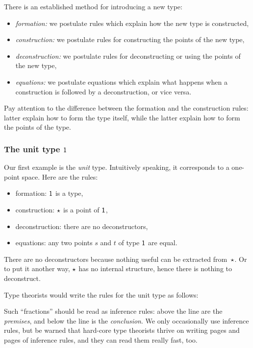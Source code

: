 \documentclass{amsart}
\begin{document}
There is an established method for introducing a new type:
%
\begin{itemize}
\item \emph{formation:} we postulate rules which explain how the new type is constructed,
\item \emph{construction:} we postulate rules for constructing the points of the new type,
\item \emph{deconstruction:} we postulate rules for deconstructing or using the points of the new type,
\item \emph{equations:} we postulate equations which explain what happens when a
  construction is followed by a deconstruction, or vice versa.
\end{itemize}
%
Pay attention to the difference between the formation and the construction
rules: latter explain how to form the type itself, while the latter explain how to
form the points of the type.


\subsubsection{The unit type $\mathsf{1}$}

Our first example is the \emph{unit} type. Intuitively speaking, it corresponds to a one-point space. Here are the rules:
%
\begin{itemize}
\item formation: $\mathsf{1}$ is a type,
\item construction: $\star$ is a point of $\mathsf{1}$,
\item deconstruction: there are no deconstructors,
\item equations: any two points $s$ and $t$ of type $\mathsf{1}$ are equal.
\end{itemize}
%
There are no deconstructors because nothing useful can be extracted from~$\star$.
Or to put it another way, $\star$ has no internal structure, hence there is
nothing to deconstruct.

Type theorists would write the rules for the unit type as follows:
%
%
Such ``fractions'' should be read as inference rules: above the line are the
\emph{premises}, and below the line is the \emph{conclusion}. We only
occasionally use inference rules, but be warned that hard-core type theorists
thrive on writing pages and pages of inference rules, and they can read them
really fast, too.
\end{document}
